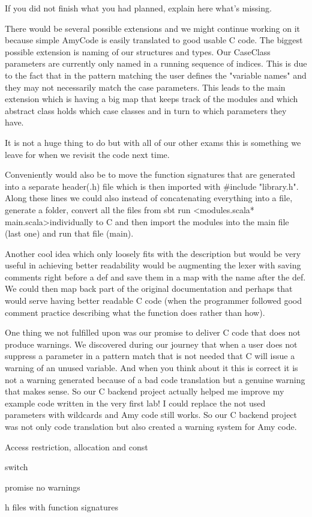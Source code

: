 If you did not finish what you had planned, explain here what's missing.


There would be several possible extensions and we might continue working on it because simple AmyCode is easily translated to good usable C code.
The biggest possible extension is naming of our structures and types. Our CaseClass parameters are currently only named in a running sequence of indices. This is due to the fact that in the pattern matching the user defines the "variable names" and they may not necessarily match the case parameters. This leads to the main extension which is having a big map that keeps track of the modules and which abstract class holds which case classes and in turn to which parameters they have.

It is not a huge thing to do but with all of our other exams this is something we leave for when we revisit the code next time.

Conveniently would also be to move the function signatures that are generated into a separate header(.h) file which is then imported with $\#$include "library.h".
Along these lines we could also instead of concatenating everything into a file, generate a folder, convert all the files from sbt run \textless modules.scala* main.scala\textgreater\space individually to C and then import the modules into the main file (last one) and run that file (main).

Another cool idea which only loosely fits with the description but would be very useful in achieving better readability would be augmenting the lexer with saving comments right before a def and save them in a map with the name after the def. We could then map back part of the original documentation and perhaps that would serve having better readable C code (when the programmer followed good comment practice describing what the function does rather than how).

One thing we not fulfilled upon was our promise to deliver C code that does not produce warnings. We discovered during our journey that when a user does not suppress a parameter in a pattern match that is not needed that C will issue a warning of an unused variable. And when you think about it this is correct it is not a warning generated because of a bad code translation but a genuine warning that makes sense. So our C backend project actually helped me improve my example code written in the very first lab! I could replace the not used parameters with wildcards and Amy code still works. So our C backend project was not only code translation but also created a warning system for Amy code.

Access restriction, allocation and const

switch  

promise no warnings

h files with function signatures